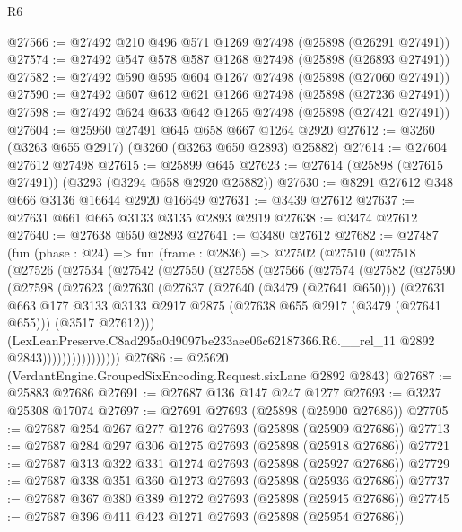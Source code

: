 \begin{lexlean}{R6}
\begin{coremodule}
@27566 := @27492 @210 @496 @571 @1269 @27498 (@25898 (@26291 @27491))
@27574 := @27492 @547 @578 @587 @1268 @27498 (@25898 (@26893 @27491))
@27582 := @27492 @590 @595 @604 @1267 @27498 (@25898 (@27060 @27491))
@27590 := @27492 @607 @612 @621 @1266 @27498 (@25898 (@27236 @27491))
@27598 := @27492 @624 @633 @642 @1265 @27498 (@25898 (@27421 @27491))
@27604 := @25960 @27491 @645 @658 @667 @1264 @2920
@27612 := @3260 (@3263 @655 @2917) (@3260 (@3263 @650 @2893) @25882)
@27614 := @27604 @27612 @27498
@27615 := @25899 @645
@27623 := @27614 (@25898 (@27615 @27491)) (@3293 (@3294 @658 @2920 @25882))
@27630 := @8291 @27612 @348 @666 @3136 @16644 @2920 @16649
@27631 := @3439 @27612
@27637 := @27631 @661 @665 @3133 @3135 @2893 @2919
@27638 := @3474 @27612
@27640 := @27638 @650 @2893
@27641 := @3480 @27612
@27682 := @27487
    (fun (phase : @24) =>
    fun (frame : @2836) =>
    @27502
      (@27510
        (@27518
          (@27526
            (@27534
              (@27542
                (@27550
                  (@27558
                    (@27566
                      (@27574
                        (@27582
                          (@27590
                            (@27598
                              (@27623
                                (@27630
                                  (@27637
                                    (@27640 (@3479 (@27641 @650)))
                                    (@27631
                                      @663
                                      @177
                                      @3133
                                      @3133
                                      @2917
                                      @2875
                                      (@27638 @655 @2917 (@3479 (@27641 @655)))
                                      (@3517 @27612)))
                                  (LexLeanPreserve.C8ad295a0d9097be233aee06c62187366.R6.__rel_11
                                    @2892
                                    @2843))))))))))))))))
@27686 := @25620 (VerdantEngine.GroupedSixEncoding.Request.sixLane @2892 @2843)
@27687 := @25883 @27686
@27691 := @27687 @136 @147 @247 @1277
@27693 := @3237 @25308 @17074
@27697 := @27691 @27693 (@25898 (@25900 @27686))
@27705 := @27687 @254 @267 @277 @1276 @27693 (@25898 (@25909 @27686))
@27713 := @27687 @284 @297 @306 @1275 @27693 (@25898 (@25918 @27686))
@27721 := @27687 @313 @322 @331 @1274 @27693 (@25898 (@25927 @27686))
@27729 := @27687 @338 @351 @360 @1273 @27693 (@25898 (@25936 @27686))
@27737 := @27687 @367 @380 @389 @1272 @27693 (@25898 (@25945 @27686))
@27745 := @27687 @396 @411 @423 @1271 @27693 (@25898 (@25954 @27686))

\end{coremodule}
\end{lexlean}
